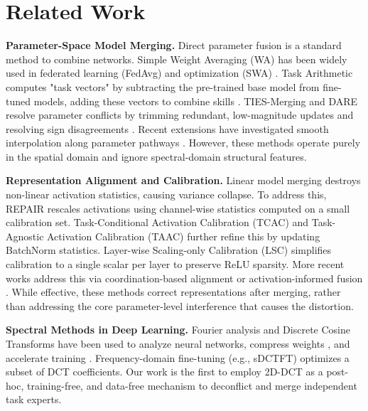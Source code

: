 \documentclass{article}
\theoremstyle{plain}
\theoremstyle{definition}
\theoremstyle{remark}
\begin{document}
\section{Related Work}
\label{sec:related}
\textbf{Parameter-Space Model Merging.} Direct parameter fusion is a standard method to combine networks. Simple Weight Averaging (WA) has been widely used in federated learning (FedAvg) \cite{mcmahan2017communication, perezcorral2026fedsq, liu2025fedswa} and optimization (SWA) \cite{izmailov2018averaging, fuller2026selfsoupervision, cheng2025whoever}. Task Arithmetic \cite{ilharco2022editing} computes "task vectors" by subtracting the pre-trained base model from fine-tuned models, adding these vectors to combine skills \cite{marczak2025task, wei2025modeling, chen2025bring, rinaldi2025update}. TIES-Merging \cite{yadav2023ties} and DARE \cite{yu2024dare} resolve parameter conflicts by trimming redundant, low-magnitude updates and resolving sign disagreements \cite{ramesh2026resolving, wu2025unlocking}. Recent extensions have investigated smooth interpolation along parameter pathways \cite{gupta2026deepweightflow, rachwa2026smooth, kuo2025exact}. However, these methods operate purely in the spatial domain and ignore spectral-domain structural features.

\textbf{Representation Alignment and Calibration.} Linear model merging destroys non-linear activation statistics, causing variance collapse. To address this, REPAIR \cite{jordan2022repair} rescales activations using channel-wise statistics computed on a small calibration set. Task-Conditional Activation Calibration (TCAC) and Task-Agnostic Activation Calibration (TAAC) further refine this by updating BatchNorm statistics. Layer-wise Scaling-only Calibration (LSC) simplifies calibration to a single scalar per layer to preserve ReLU sparsity. More recent works address this via coordination-based alignment or activation-informed fusion \cite{zhao2026coordinate, corbeil2025modular, panariello2025accurate, chen2025uncertaintyaware}. While effective, these methods correct representations after merging, rather than addressing the core parameter-level interference that causes the distortion.

\textbf{Spectral Methods in Deep Learning.} Fourier analysis and Discrete Cosine Transforms have been used to analyze neural networks, compress weights \cite{chen2016compressing}, and accelerate training \cite{wei2026improved, das2026dsca, li2026pmdet, yuan2025superficial, wei2025unifying}. Frequency-domain fine-tuning (e.g., sDCTFT) optimizes a subset of DCT coefficients. Our work is the first to employ 2D-DCT as a post-hoc, training-free, and data-free mechanism to deconflict and merge independent task experts.
\end{document}
